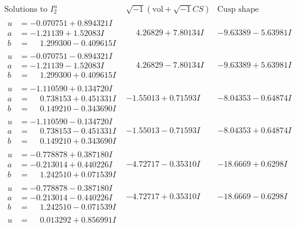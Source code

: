 \documentclass[1p]{elsarticle_modified}
\theoremstyle{definition}
\newcommand{\I}{\sqrt{-1}}
\begin{document}
$$\begin{array}{c|c|c}  
\text{Solutions to }I^u_{2}& \I (\text{vol} + \sqrt{-1}CS) & \text{Cusp shape}\\
 \hline 
\begin{aligned}
u &= -0.070751 + 0.894321 I \\
a &= -1.21139 + 1.52083 I \\
b &= \phantom{-}1.299300 - 0.409615 I\end{aligned}
 & \phantom{-}4.26829 + 7.80134 I & -9.63389 - 5.63981 I \\ \hline\begin{aligned}
u &= -0.070751 - 0.894321 I \\
a &= -1.21139 - 1.52083 I \\
b &= \phantom{-}1.299300 + 0.409615 I\end{aligned}
 & \phantom{-}4.26829 - 7.80134 I & -9.63389 + 5.63981 I \\ \hline\begin{aligned}
u &= -1.110590 + 0.134720 I \\
a &= \phantom{-}0.738153 + 0.451331 I \\
b &= \phantom{-}0.149210 - 0.343690 I\end{aligned}
 & -1.55013 + 0.71593 I & -8.04353 - 0.64874 I \\ \hline\begin{aligned}
u &= -1.110590 - 0.134720 I \\
a &= \phantom{-}0.738153 - 0.451331 I \\
b &= \phantom{-}0.149210 + 0.343690 I\end{aligned}
 & -1.55013 - 0.71593 I & -8.04353 + 0.64874 I \\ \hline\begin{aligned}
u &= -0.778878 + 0.387180 I \\
a &= -0.213014 + 0.440226 I \\
b &= \phantom{-}1.242510 + 0.071539 I\end{aligned}
 & -4.72717 - 0.35310 I & -18.6669 + 0.6298 I \\ \hline\begin{aligned}
u &= -0.778878 - 0.387180 I \\
a &= -0.213014 - 0.440226 I \\
b &= \phantom{-}1.242510 - 0.071539 I\end{aligned}
 & -4.72717 + 0.35310 I & -18.6669 - 0.6298 I \\ \hline\begin{aligned}
u &= \phantom{-}0.013292 + 0.856991 I \\

\end{aligned}
\end{array}$$
\end{document}
